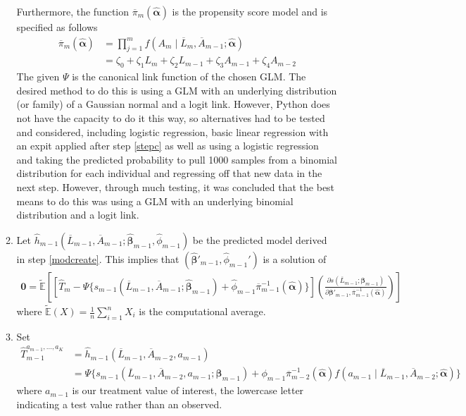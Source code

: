 \begin{enumerate}
\begin{enumerate}
Furthermore, the function $\overline{\pi}_m(\hat{\mathbf{\alpha}})$ is the propensity score model and is specified as follows
\begin{align} 
\overline{\pi}_m(\hat{\mathbf{\alpha}}) &= \prod_{j=1}^m f(A_m \mid \overline{L}_m, \overline{A}_{m-1}; \hat{\mathbf{\alpha}}) \\
&= \zeta_0 + \zeta_1 L_m + \zeta_2 L_{m-1} + \zeta_3 A_{m-1} + \zeta_4 A_{m-2}
\end{align}
The given $\Psi$ is the canonical link function of the chosen GLM.  The desired method to do this is using a GLM with an underlying distribution (or family) of a Gaussian normal and a logit link.  However, Python does not have the capacity to do it this way, so alternatives had to be tested and considered, including logistic regression, basic linear regression with an expit applied after step \ref{stepc} as well as using a logistic regression and taking the predicted probability to pull 1000 samples from a binomial distribution for each individual and regressing off that new data in the next step. However, through much testing, it was concluded that the best means to do this was using a GLM with an underlying binomial distribution and a logit link.  

\item Let $ \hat{h}_{m-1}(\overline{L}_{m-1}, \overline{A}_{m-1}; \hat{\mathbf{\beta}}_{m-1}, \hat{\phi}_{m-1})$ be the predicted model derived in step \ref{modcreate}.  This implies that $(\hat{\mathbf{\beta}}'_{m-1}, \hat{\phi}_{m-1}')$ is a solution of 
\begin{align}
\mathbf{0} = \tilde{\mathbb{E}} \left[ \left[\hat{T}_{m} - \Psi \{ s_{m-1}(\overline{L}_{m-1}, \overline{A}_{m-1}; \hat{\mathbf{\beta}}_{m-1}) + \hat{\phi}_{m-1} \overline{\pi}^{-1}_{m-1}(\hat{\mathbf{\alpha}}) \} \right] \left( \frac{\partial s (\overline{L}_{m-1}; \mathbf{\beta}_{m-1})}{\partial \mathbf{\beta}'_{m-1}, \overline{\pi}^{-1}_{m-1}(\hat{\mathbf{\alpha}})} \right) \right]
\end{align}
where $\tilde{\mathbb{E}}(X) = \frac{1}{n} \sum_{i=1}^n X_i$ is the computational average.  

\item \label{stepc} Set 
\begin{align} 
\hat{T}_{m-1}^{a_{m-1}, \dots, a_K} &= \hat{h}_{m-1}(\overline{L}_{m-1}, \overline{A}_{m-2}, a_{m-1}) \\
&=  \Psi \{s_{m-1}(\overline{L}_{m-1}, \overline{A}_{m-2}, a_{m-1}; \mathbf{\beta}_{m-1}) + \phi_{m-1} \overline{\pi}_{m-2}^{-1} (\hat{\mathbf{\alpha}}) f(a_{m-1} \mid \overline{L}_{m-1}, \overline{A}_{m-2}; \hat{\mathbf{\alpha}}) \}
\end{align} 
where $a_{m-1}$ is our treatment value of interest, the lowercase letter indicating a test value rather than an observed.  
\end{enumerate}


\end{enumerate}
